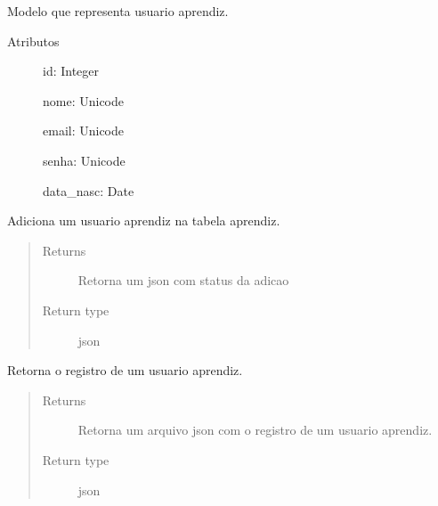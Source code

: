 \documentclass[letterpaper,10pt,english]{sphinxmanual}
\begin{document}
\begin{fulllineitems}
\label{\detokenize{index:aprendiz.Aprendiz}}
Modelo que representa usuario aprendiz.
\begin{description}
\item[{Atributos}] \leavevmode
id: Integer

nome: Unicode

email: Unicode

senha: Unicode

data\_nasc: Date

\end{description}

\end{fulllineitems}


\begin{fulllineitems}
\label{\detokenize{index:aprendiz.add_Aprendiz}}
Adiciona um usuario aprendiz na tabela
aprendiz.
\begin{quote}\begin{description}
\item[{Returns}] \leavevmode
Retorna um json com status da adicao

\item[{Return type}] \leavevmode
json

\end{description}\end{quote}

\end{fulllineitems}


\begin{fulllineitems}
\label{\detokenize{index:aprendiz.get_Aprendiz}}
Retorna o registro de um usuario
aprendiz.
\begin{quote}\begin{description}
\item[{Returns}] \leavevmode
Retorna um arquivo json com o registro de um usuario aprendiz.

\item[{Return type}] \leavevmode
json

\end{description}\end{quote}

\end{fulllineitems}
\end{document}
